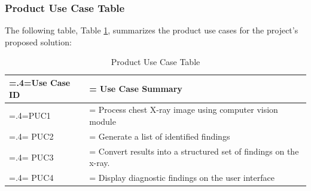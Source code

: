 \documentclass[12pt]{article}
\begin{document}
\subsubsection{Product Use Case Table}
The following table, Table \ref{table:productUseCase}, summarizes the product use cases for the project's proposed solution:
\begin{table}[H]
    \caption{Product Use Case Table}
    \label{table:productUseCase}
    \begin{tabularx}{\textwidth}{|>{\hsize=.4\hsize\linewidth=\hsize}X|>{\hsize=1.6\hsize\linewidth=\hsize}X|}
    \hline
    Use Case ID & Use Case Summary \\
    \hline
    PUC1 & Process chest X-ray image using computer vision module \\
    \hline
    PUC2 & Generate a list of identified findings \\
    \hline
    PUC3 & Convert results into a structured set of findings on the x-ray. \\
    \hline
    PUC4 & Display diagnostic findings on the user interface \\
    \hline
    \end{tabularx}
\end{table}
\end{document}
